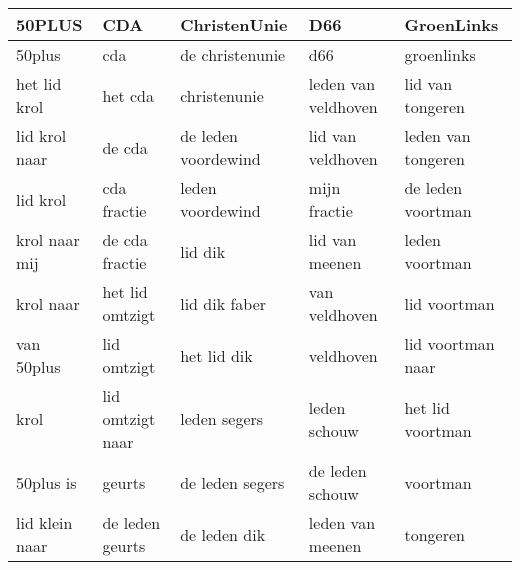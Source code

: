 \begin{tabular}{lllll}
\toprule
         50PLUS &               CDA &         ChristenUnie &                  D66 &          GroenLinks \\
\midrule
         50plus &               cda &      de christenunie &                  d66 &          groenlinks \\
   het lid krol &           het cda &         christenunie &  leden van veldhoven &    lid van tongeren \\
  lid krol naar &            de cda &  de leden voordewind &    lid van veldhoven &  leden van tongeren \\
       lid krol &       cda fractie &     leden voordewind &         mijn fractie &   de leden voortman \\
  krol naar mij &    de cda fractie &              lid dik &       lid van meenen &      leden voortman \\
      krol naar &   het lid omtzigt &        lid dik faber &        van veldhoven &        lid voortman \\
     van 50plus &       lid omtzigt &          het lid dik &            veldhoven &   lid voortman naar \\
           krol &  lid omtzigt naar &         leden segers &         leden schouw &    het lid voortman \\
      50plus is &            geurts &      de leden segers &      de leden schouw &            voortman \\
 lid klein naar &   de leden geurts &         de leden dik &     leden van meenen &            tongeren \\
\bottomrule
\end{tabular}
